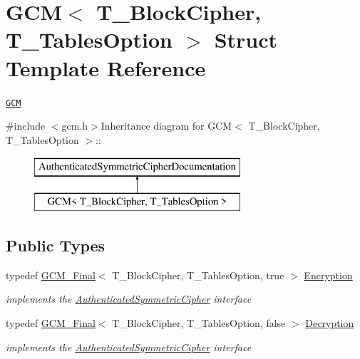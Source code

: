 \hypertarget{struct_g_c_m}{
\section{GCM$<$ T\_\-BlockCipher, T\_\-TablesOption $>$ Struct Template Reference}
\label{struct_g_c_m}
}


\href{http://www.cryptolounge.org/wiki/GCM}{\tt GCM}  


{\ttfamily \#include $<$gcm.h$>$}Inheritance diagram for GCM$<$ T\_\-BlockCipher, T\_\-TablesOption $>$::\begin{figure}[H]
\begin{center}
\leavevmode
\includegraphics[height=2cm]{struct_g_c_m}
\end{center}
\end{figure}
\subsection*{Public Types}
\begin{DoxyCompactItemize}
\item 
\hypertarget{struct_g_c_m_ac0b9f3c915545e9459fe2b25c3dcbc28}{
typedef \hyperlink{class_g_c_m___final}{GCM\_\-Final}$<$ T\_\-BlockCipher, T\_\-TablesOption, true $>$ \hyperlink{struct_g_c_m_ac0b9f3c915545e9459fe2b25c3dcbc28}{Encryption}}
\label{struct_g_c_m_ac0b9f3c915545e9459fe2b25c3dcbc28}

\begin{DoxyCompactList}\small\item\em implements the \hyperlink{class_authenticated_symmetric_cipher}{AuthenticatedSymmetricCipher} interface \item\end{DoxyCompactList}\item 
\hypertarget{struct_g_c_m_a4170aa6076e91954625653b7ad774829}{
typedef \hyperlink{class_g_c_m___final}{GCM\_\-Final}$<$ T\_\-BlockCipher, T\_\-TablesOption, false $>$ \hyperlink{struct_g_c_m_a4170aa6076e91954625653b7ad774829}{Decryption}}
\label{struct_g_c_m_a4170aa6076e91954625653b7ad774829}

\begin{DoxyCompactList}\small\item\em implements the \hyperlink{class_authenticated_symmetric_cipher}{AuthenticatedSymmetricCipher} interface \item\end{DoxyCompactList}\end{DoxyCompactItemize}


